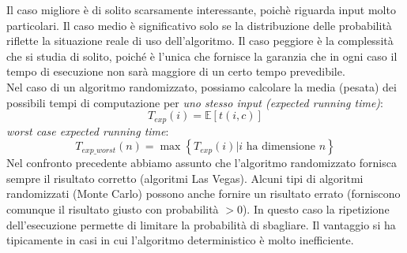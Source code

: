 \documentclass[12pt]{article}
\begin{document}
Il caso migliore è di solito scarsamente interessante, poichè riguarda input molto particolari. Il caso medio è significativo solo se la distribuzione delle probabilità riflette la situazione reale di uso dell'algoritmo. Il caso peggiore è la complessità che si studia di solito, poiché è l'unica che fornisce la garanzia che in ogni caso il tempo di esecuzione non sarà maggiore di un certo tempo prevedibile.\\
Nel caso di un algoritmo randomizzato, possiamo calcolare la media (pesata) dei possibili tempi di computazione per \textit{uno stesso input (expected running time)}:
\begin{equation}
    T_{exp}(i) = \mathbb{E}\left[t(i,c)\right]
\end{equation}
\textit{worst case expected running time}:
\begin{equation}
    T_{exp\_worst}(n) = \max\left\{T_{exp}(i)|i \text{ ha dimensione }n\right\}
\end{equation}
Nel confronto precedente abbiamo assunto che l'algoritmo randomizzato fornisca sempre il risultato corretto (algoritmi Las Vegas). Alcuni tipi di algoritmi randomizzati (Monte Carlo) possono anche fornire un risultato errato (forniscono comunque il risultato giusto con probabilità \(> 0\)). In questo caso la ripetizione dell'esecuzione permette di limitare la probabilità di sbagliare. Il vantaggio si ha tipicamente in casi in cui l'algoritmo deterministico è molto inefficiente.
\end{document}
